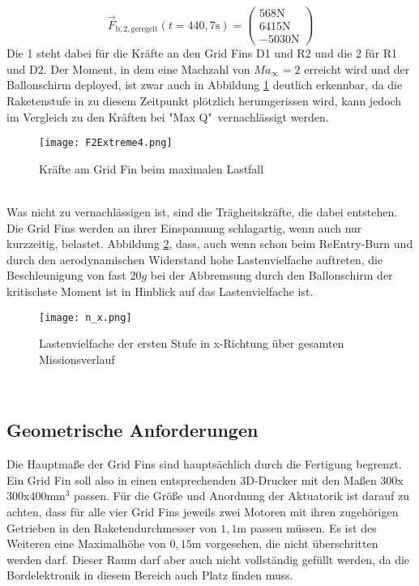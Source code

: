 \begin{equation}\label{eq_Fmax2}
\vec{F}_\mathrm{b, 2, geregelt}(t=440,7\mathrm{s})
=\left(\begin{array}{c}568\mathrm{N}\\6415\mathrm{N}\\-5030\mathrm{N}\end{array}\right)
\end{equation}
Die 1 steht dabei für die Kräfte an den Grid Fins D1 und R2 und die 2 für R1 und D2.
Der Moment, in dem eine Machzahl von $Ma_\infty = 2$ erreicht wird und der Ballonschirm deployed, ist zwar auch in Abbildung \ref{abb_FExtreme} deutlich erkennbar, da die Raketenstufe in zu diesem Zeitpunkt plötzlich herumgerissen wird, kann jedoch im Vergleich zu den Kräften bei "Max Q"\ vernachlässigt werden.
\begin{figure}[h] 
	\centering
	\texttt{[image: F2Extreme4.png]}
	\caption{Kräfte am Grid Fin beim maximalen Lastfall}
	\label{abb_FExtreme}
\end{figure}\\
Was nicht zu vernachlässigen ist, sind die Trägheitskräfte, die dabei entstehen. Die Grid Fins werden an ihrer Einspannung schlagartig, wenn auch nur kurzzeitig, belastet. Abbildung \ref{abb_n_x}, dass, auch wenn schon beim ReEntry-Burn und durch den aerodynamischen Widerstand hohe Lastenvielfache auftreten, die Beschleunigung von fast 20$g$ bei der Abbremsung durch den Ballonschirm der kritischste Moment ist in Hinblick auf das Lastenvielfache ist.
\begin{figure}[h] 
	\centering
	\texttt{[image: n\_x.png]}
	\caption{Lastenvielfache der ersten Stufe in x-Richtung über gesamten Missionsverlauf}
	\label{abb_n_x}
\end{figure}\\
\subsection{Geometrische Anforderungen}
Die Hauptmaße der Grid Fins sind hauptsächlich durch die Fertigung begrenzt. Ein Grid Fin soll also in einen entsprechenden 3D-Drucker mit den Maßen $300$x$300$x$400\mathrm{mm}^3$ passen. Für die Größe und Anordnung der Aktuatorik ist darauf zu achten, dass für alle vier Grid Fins jeweils zwei Motoren mit ihren zugehörigen Getrieben in den Raketendurchmesser von $1,1$m passen müssen. Es ist des Weiteren eine Maximalhöhe von $0,15$m vorgesehen, die nicht überschritten werden darf. Dieser Raum darf aber auch nicht vollständig gefüllt werden, da die Bordelektronik in diesem Bereich auch Platz finden muss.
